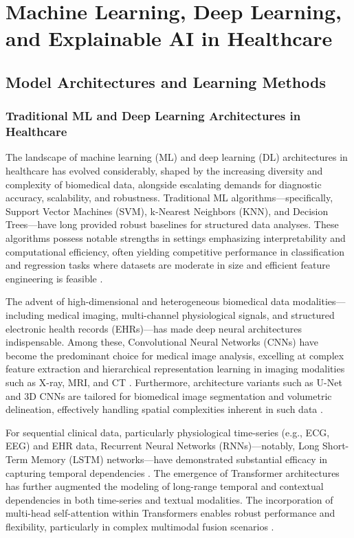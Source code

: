 \section{Machine Learning, Deep Learning, and Explainable AI in Healthcare}

\subsection{Model Architectures and Learning Methods}

\subsubsection{Traditional ML and Deep Learning Architectures in Healthcare}

The landscape of machine learning (ML) and deep learning (DL) architectures in healthcare has evolved considerably, shaped by the increasing diversity and complexity of biomedical data, alongside escalating demands for diagnostic accuracy, scalability, and robustness. Traditional ML algorithms—specifically, Support Vector Machines (SVM), k-Nearest Neighbors (KNN), and Decision Trees—have long provided robust baselines for structured data analyses. These algorithms possess notable strengths in settings emphasizing interpretability and computational efficiency, often yielding competitive performance in classification and regression tasks where datasets are moderate in size and efficient feature engineering is feasible \cite{ref16, ref28}.

The advent of high-dimensional and heterogeneous biomedical data modalities—including medical imaging, multi-channel physiological signals, and structured electronic health records (EHRs)—has made deep neural architectures indispensable. Among these, Convolutional Neural Networks (CNNs) have become the predominant choice for medical image analysis, excelling at complex feature extraction and hierarchical representation learning in imaging modalities such as X-ray, MRI, and CT \cite{ref28, ref31, ref50, ref55, ref70, ref71, ref72, ref74, ref75, ref90, ref107}. Furthermore, architecture variants such as U-Net and 3D CNNs are tailored for biomedical image segmentation and volumetric delineation, effectively handling spatial complexities inherent in such data \cite{ref49, ref50, ref56, ref53}.

For sequential clinical data, particularly physiological time-series (e.g., ECG, EEG) and EHR data, Recurrent Neural Networks (RNNs)—notably, Long Short-Term Memory (LSTM) networks—have demonstrated substantial efficacy in capturing temporal dependencies \cite{ref29, ref42, ref43, ref55}. The emergence of Transformer architectures has further augmented the modeling of long-range temporal and contextual dependencies in both time-series and textual modalities. The incorporation of multi-head self-attention within Transformers enables robust performance and flexibility, particularly in complex multimodal fusion scenarios \cite{ref28, ref31, ref35, ref48, ref49, ref54, ref65, ref76, ref77, ref90}.

